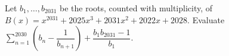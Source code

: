 Let $b_1,\ldots,b_{2031}$ be the roots, counted with multiplicity, of $B(x)=x^{2031}+2025x^3+2031x^2+2022x+2028$. Evaluate $\sum_{n=1}^{2030}(b_n-\dfrac{1}{b_{n+1}})+\dfrac{b_1b_{2031}-1}{b_1}$.

